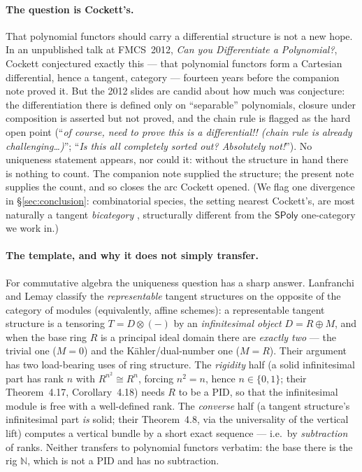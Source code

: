 \documentclass[11pt]{article}
\theoremstyle{definition}
\newcommand{\SPoly}{\mathsf{SPoly}}
\newcommand{\N}{\mathbb{N}}
\begin{document}
\paragraph{The question is Cockett's.}
That polynomial functors should carry a differential structure is not a new hope. In an
unpublished talk at FMCS~2012, \emph{Can you Differentiate a Polynomial?}, Cockett
\cite{Cockett2012} conjectured exactly this --- that polynomial functors form a Cartesian
differential, hence a tangent, category --- fourteen years before the companion note proved it.
But the 2012 slides are candid about how much was conjecture: the differentiation there is defined
only on ``separable'' polynomials, closure under composition is asserted but not proved, and the
chain rule is flagged as the hard open point (``\emph{of course, need to prove this is a
differential!! (chain rule is already challenging\ldots)}''; ``\emph{Is this all completely sorted
out? Absolutely not!}''). No uniqueness statement appears, nor could it: without the structure in
hand there is nothing to count. The companion note supplied the structure; the present note
supplies the count, and so closes the arc Cockett opened. (We flag one divergence in
\S\ref{sec:conclusion}: combinatorial species, the setting nearest Cockett's, are most naturally a
tangent \emph{bicategory} \cite{MO341933}, structurally different from the $\SPoly$ one-category we
work in.)

\paragraph{The template, and why it does not simply transfer.}
For commutative algebra the uniqueness question has a sharp answer. Lanfranchi and Lemay
\cite{LanfranchiLemay2025} classify the \emph{representable} tangent structures on the opposite of
the category of modules (equivalently, affine schemes): a representable tangent structure is a
tensoring $T=D\otimes(-)$ by an \emph{infinitesimal object} $D=R\oplus M$, and when the base ring
$R$ is a principal ideal domain there are \emph{exactly two} --- the trivial one ($M=0$) and the
Kähler/dual-number one ($M=R$). Their argument has two load-bearing uses of ring structure. The
\emph{rigidity} half (a solid infinitesimal part has rank $n$ with $R^{n^2}\cong R^n$, forcing
$n^2=n$, hence $n\in\{0,1\}$; their Theorem~4.17, Corollary~4.18) needs $R$ to be a PID, so that
the infinitesimal module is free with a well-defined rank. The \emph{converse} half (a tangent
structure's infinitesimal part \emph{is} solid; their Theorem~4.8, via the universality of the
vertical lift) computes a vertical bundle by a short exact sequence --- i.e.\ by \emph{subtraction}
of ranks. Neither transfers to polynomial functors verbatim: the base there is the rig $\N$, which
is not a PID and has no subtraction.
\end{document}
